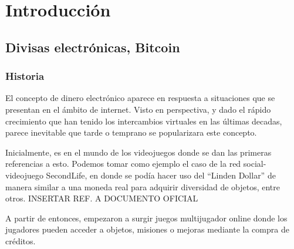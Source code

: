 %
%

\chapter{Introducci\'on}



\label{cap1:sec:introduccion}

\section{Divisas electr\'onicas, Bitcoin}

\subsection{Historia}

El concepto de dinero electr\'onico aparece en respuesta a situaciones que se presentan en el \'ambito de internet. Visto en perspectiva, y dado el r\'apido crecimiento que han tenido los intercambios virtuales en las \'ultimas decadas, parece inevitable que tarde o temprano se popularizara este concepto.

Inicialmente, es en el mundo de los videojuegos donde se dan las primeras referencias a esto. Podemos tomar como ejemplo el caso de la red social-videojuego SecondLife, en donde se pod\'ia hacer uso del ``Linden Dollar'' de manera similar a una moneda real para adquirir diversidad de objetos, entre otros. INSERTAR REF. A DOCUMENTO OFICIAL

A partir de entonces, empezaron a surgir juegos multijugador online donde los jugadores pueden acceder a objetos, misiones o mejoras mediante la compra de cr\'editos.

